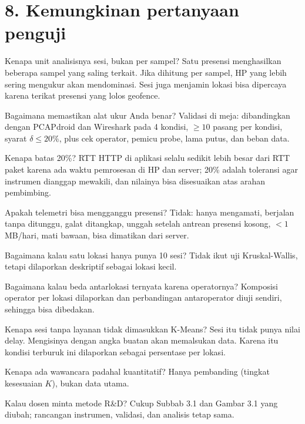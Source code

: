 \section*{8. Kemungkinan pertanyaan penguji}
\setcounter{tanya}{0}
\begin{tanya}{Kenapa unit analisisnya sesi, bukan per sampel?}
Satu presensi menghasilkan beberapa sampel yang saling terkait. Jika dihitung per sampel, HP yang lebih sering mengukur akan mendominasi. Sesi juga menjamin lokasi bisa dipercaya karena terikat presensi yang lolos geofence.
\end{tanya}
\begin{tanya}{Bagaimana memastikan alat ukur Anda benar?}
Validasi di meja: dibandingkan dengan PCAPdroid dan Wireshark pada 4 kondisi, $\geq10$ pasang per kondisi, syarat $\delta\leq20\%$, plus cek operator, pemicu probe, lama putus, dan beban data.
\end{tanya}
\begin{tanya}{Kenapa batas 20\%?}
RTT HTTP di aplikasi selalu sedikit lebih besar dari RTT paket karena ada waktu pemrosesan di HP dan server; 20\% adalah toleransi agar instrumen dianggap mewakili, dan nilainya bisa disesuaikan atas arahan pembimbing.
\end{tanya}
\begin{tanya}{Apakah telemetri bisa mengganggu presensi?}
Tidak: hanya mengamati, berjalan tanpa ditunggu, galat ditangkap, unggah setelah antrean presensi kosong, $<1$ MB/hari, mati bawaan, bisa dimatikan dari server.
\end{tanya}
\begin{tanya}{Bagaimana kalau satu lokasi hanya punya 10 sesi?}
Tidak ikut uji Kruskal-Wallis, tetapi dilaporkan deskriptif sebagai lokasi kecil.
\end{tanya}
\begin{tanya}{Bagaimana kalau beda antarlokasi ternyata karena operatornya?}
Komposisi operator per lokasi dilaporkan dan perbandingan antaroperator diuji sendiri, sehingga bisa dibedakan.
\end{tanya}
\begin{tanya}{Kenapa sesi tanpa layanan tidak dimasukkan K-Means?}
Sesi itu tidak punya nilai delay. Mengisinya dengan angka buatan akan memalsukan data. Karena itu kondisi terburuk ini dilaporkan sebagai persentase per lokasi.
\end{tanya}
\begin{tanya}{Kenapa ada wawancara padahal kuantitatif?}
Hanya pembanding (tingkat kesesuaian $K$), bukan data utama.
\end{tanya}
\begin{tanya}{Kalau dosen minta metode R\&D?}
Cukup Subbab 3.1 dan Gambar 3.1 yang diubah; rancangan instrumen, validasi, dan analisis tetap sama.
\end{tanya}

